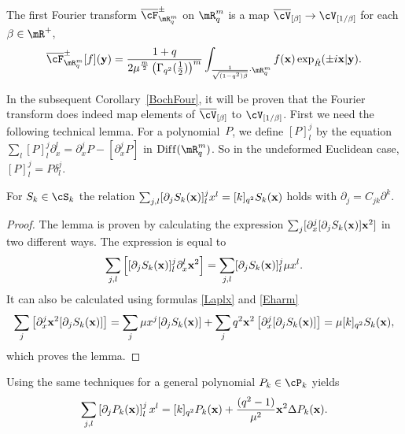\begin{definition}
\label{defFour1}
The f\/irst Fourier transform $\overline{\cF}^{\pm}_{\mR^m_q}$ on $\mR^m_q$ is a map $\overline{\cV}_{[\beta]}\to\cV_{[1/\beta]}$ for each $\beta\in\mR^+$,
\begin{gather*}
\overline{\cF}^\pm_{\mR^m_q}[f](\bold{y}) = \frac{1+q}{2\mu^{\frac{m}{2}}\left(\Gamma_{q^2}(\frac{1}{2})\right)^{m}}\int_{\frac{1}{\sqrt{(1-q^2)\beta}}\cdot\mR^m_q}f(\bold{x})\exp_{\hat{R}}(\pm i\bold{x}|\bold{y}).
\end{gather*}
\end{definition}
In the subsequent Corollary~\ref{BochFour}, it will be proven that the Fourier transform does indeed map elements of $\overline{\cV}_{[\beta]}$ to $\cV_{[1/\beta]}$. First we need the following technical lemma. For a polynomial~$P$, we def\/ine $[P]^j_l$ by the equation $\sum_l [P]^j_l\partial_x^l=\partial_x^j P-\left[\partial^j_xP\right]$ in ${\rm Dif\/f}(\mR^m_q)$. So in the undeformed Euclidean case, $[P]^j_l=P\delta_l^j$.
\begin{lemma}\label{Svrexp}
For $S_k\in\cS_k$ the relation $\sum_{j,l}[\partial_jS_k(\bold{x})]^j_lx^l=[k]_{q^2}S_k(\bold{x})$ holds with $\partial_j=C_{jk}\partial^k$.
\end{lemma}

\begin{proof}
The lemma is proven by calculating the expression $\sum_j [\partial_x^j[\partial_jS_k(\bold{x})]\bold{x}^2 ]$ in two dif\/ferent ways. The expression is equal to
\begin{gather*}
\sum_{j,l}\left[[\partial_jS_k(\bold{x})]^j_l\partial_x^l\bold{x}^2\right] = \sum_{j,l}[\partial_jS_k(\bold{x})]^j_l\mu x^l.
\end{gather*}
It can also be calculated using formulas \eqref{Laplx} and \eqref{Eharm}
\begin{gather*}
\sum_j\left[\partial_x^j\bold{x}^2[\partial_jS_k(\bold{x})]\right] = \sum_j\mu x^j[\partial_jS_k(\bold{x})]+\sum_jq^2\bold{x}^2\left[\partial_x^j[\partial_jS_k(\bold{x})]\right]=\mu [k]_{q^2}S_k(\bold{x}),
\end{gather*}
which proves the lemma.
\end{proof}

\begin{remark}
Using the same techniques for a general polynomial $P_k\in\cP_k$ yields
\begin{gather*}
\sum_{j,l}\left[\partial_j P_k(\bold{x})\right]^j_lx^l=[k]_{q^2}P_k(\bold{x})+\frac{(q^2-1)}{\mu^2}\bold{x}^2\Delta P_k(\bold{x}).
\end{gather*}
\end{remark}

